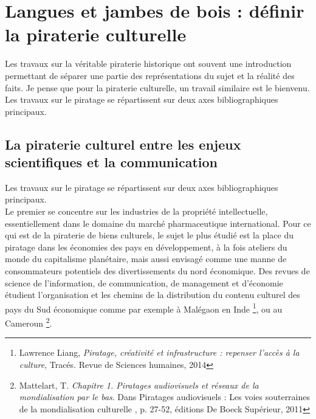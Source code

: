 \section{Langues et jambes de bois : définir la piraterie culturelle}

Les travaux sur la véritable piraterie historique ont souvent une introduction permettant de séparer une partie des représentations du sujet et la réalité des faits. Je pense que pour la piraterie culturelle, un travail similaire est le bienvenu. Les travaux sur le piratage se répartissent sur deux axes bibliographiques principaux.\\

\subsection*{La piraterie culturel entre les enjeux scientifiques et la communication}

Les travaux sur le piratage se répartissent sur deux axes bibliographiques principaux.\\

Le premier se concentre sur les industries de la propriété intellectuelle, essentiellement dans le domaine du marché pharmaceutique international. Pour ce qui est de la piraterie de biens culturels, le sujet le plus étudié est la place du piratage dans les économies des pays en développement, à la fois ateliers du monde du capitalisme planétaire, mais aussi envisagé comme une manne de consommateurs potentiels des divertissements du nord économique. Des revues de science de l'information, de communication, de management et d'économie étudient l'organisation et les chemins de la distribution du contenu culturel des pays du Sud économique comme par exemple à Malégaon en Inde \footnote{Lawrence Liang,\textit{ Piratage, créativité et infrastructure : repenser l’accès à la culture}, Tracés. Revue de Sciences humaines, 2014}, ou au Cameroun \footnote{Mattelart, T.\textit{ Chapitre 1. Piratages audiovisuels et réseaux de la mondialisation par le bas}. Dans \og Piratages audiovisuels : Les voies souterraines de la mondialisation culturelle \fg, p. 27-52, éditions De Boeck Supérieur, 2011}.

